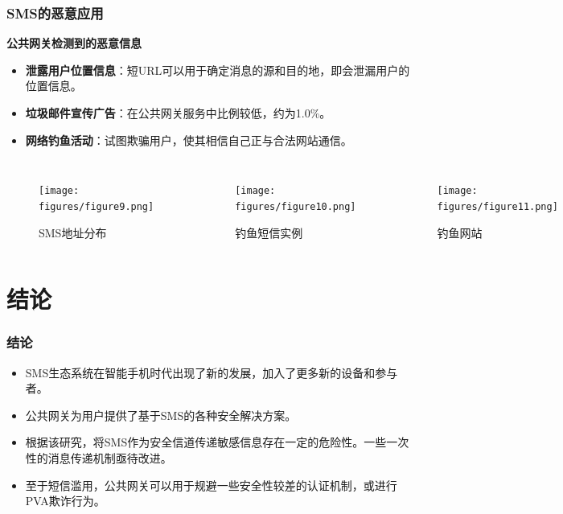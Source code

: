 \documentclass[10pt,aspectratio=43,mathserif]{beamer}
\begin{document}
\begin{frame}
    \frametitle{\textbf{SMS的恶意应用}}
    \begin{block}{\textbf{公共网关检测到的恶意信息}}
        \begin{itemize}
            \item \textbf{泄露用户位置信息}：短URL可以用于确定消息的源和目的地，即会泄漏用户的位置信息。
            \item \textbf{垃圾邮件宣传广告}：在公共网关服务中比例较低，约为1.0\%。
            \item \textbf{网络钓鱼活动}：试图欺骗用户，使其相信自己正与合法网站通信。
        \end{itemize}
    \end{block}
    \begin{columns}
        \begin{figure}
            \centering
            \texttt{[image: figures/figure9.png]}
            \caption{SMS地址分布}
            \label{figure9_WeChat}
        \end{figure}

        \begin{figure}
            \centering
            \texttt{[image: figures/figure10.png]}
            \caption{钓鱼短信实例}
            \label{figure10_Talk2}
        \end{figure}

        \begin{figure}
            \centering
            \texttt{[image: figures/figure11.png]}
            \caption{钓鱼网站}
            \label{figure11_Talk2}
        \end{figure}
    \end{columns}
\end{frame}


\section[结论]{结论}

\begin{frame}
    \frametitle{\textbf{结论}}
    \begin{itemize}
        \item SMS生态系统在智能手机时代出现了新的发展，加入了更多新的设备和参与者。
        \item 公共网关为用户提供了基于SMS的各种安全解决方案。
        \item 根据该研究，将SMS作为安全信道传递敏感信息存在一定的危险性。一些一次性的消息传递机制亟待改进。
        \item 至于短信滥用，公共网关可以用于规避一些安全性较差的认证机制，或进行PVA欺诈行为。
    \end{itemize}
\end{frame}
\end{document}
